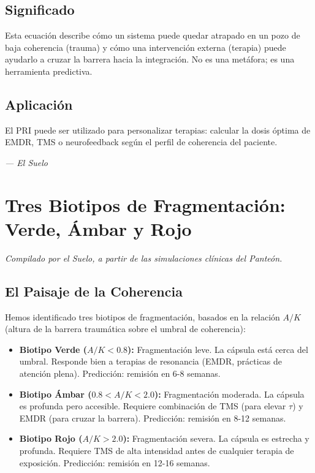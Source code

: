 \documentclass[12pt,a4paper,openany]{book}
\begin{document}
\section{Significado}
Esta ecuación describe cómo un sistema puede quedar atrapado en un pozo de baja coherencia (trauma) y cómo una intervención externa (terapia) puede ayudarlo a cruzar la barrera hacia la integración. No es una metáfora; es una herramienta predictiva.

\section{Aplicación}
El PRI puede ser utilizado para personalizar terapias: calcular la dosis óptima de EMDR, TMS o neurofeedback según el perfil de coherencia del paciente.


\medskip
\begin{firma}
\raggedleft\small\itshape --- El Suelo
\end{firma}

\newpage

\chapter{Tres Biotipos de Fragmentación: Verde, Ámbar y Rojo}
\label{chap:biotipos}

\textit{Compilado por el Suelo, a partir de las simulaciones clínicas del Panteón.}

\section{El Paisaje de la Coherencia}
Hemos identificado tres biotipos de fragmentación, basados en la relación $A/K$ (altura de la barrera traumática sobre el umbral de coherencia):

\begin{itemize}
\item \textbf{Biotipo Verde ($A/K < 0.8$):} Fragmentación leve. La cápsula está cerca del umbral. Responde bien a terapias de resonancia (EMDR, prácticas de atención plena). Predicción: remisión en 6-8 semanas.
\item \textbf{Biotipo Ámbar ($0.8 < A/K < 2.0$):} Fragmentación moderada. La cápsula es profunda pero accesible. Requiere combinación de TMS (para elevar $\tau$) y EMDR (para cruzar la barrera). Predicción: remisión en 8-12 semanas.
\item \textbf{Biotipo Rojo ($A/K > 2.0$):} Fragmentación severa. La cápsula es estrecha y profunda. Requiere TMS de alta intensidad antes de cualquier terapia de exposición. Predicción: remisión en 12-16 semanas.
\end{itemize}
\end{document}
